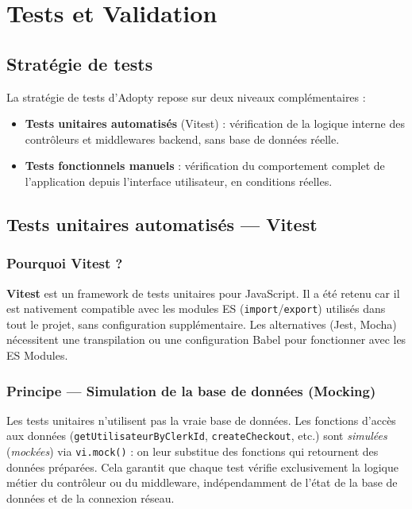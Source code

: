 \documentclass[12pt,a4paper]{report}
\begin{document}
\section{Tests et Validation}

\subsection{Stratégie de tests}

La stratégie de tests d'Adopty repose sur deux niveaux complémentaires :
\begin{itemize}[leftmargin=2em,itemsep=3pt]
  \item \textbf{Tests unitaires automatisés} (Vitest) : vérification de la logique interne des contrôleurs et middlewares backend, sans base de données réelle.
  \item \textbf{Tests fonctionnels manuels} : vérification du comportement complet de l'application depuis l'interface utilisateur, en conditions réelles.
\end{itemize}

\subsection{Tests unitaires automatisés --- Vitest}

\subsubsection{Pourquoi Vitest ?}

\textbf{Vitest} est un framework de tests unitaires pour JavaScript. Il a été retenu car il est nativement compatible avec les modules ES (\texttt{import}/\texttt{export}) utilisés dans tout le projet, sans configuration supplémentaire. Les alternatives (Jest, Mocha) nécessitent une transpilation ou une configuration Babel pour fonctionner avec les ES Modules.

\subsubsection{Principe --- Simulation de la base de données (Mocking)}

Les tests unitaires n'utilisent pas la vraie base de données. Les fonctions d'accès aux données (\texttt{getUtilisateurByClerkId}, \texttt{createCheckout}, etc.) sont \textit{simulées} (\textit{mockées}) via \texttt{vi.mock()} : on leur substitue des fonctions qui retournent des données préparées. Cela garantit que chaque test vérifie exclusivement la logique métier du contrôleur ou du middleware, indépendamment de l'état de la base de données et de la connexion réseau.
\end{document}
